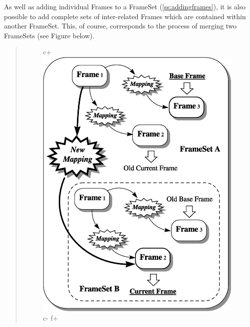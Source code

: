 \documentclass[twoside,11pt]{article}
\newcommand{\secref}[1]{\S\ref{#1}}
\renewcommand{\secref}[1]{\ref{#1}}
\begin{document}
\begin{htmlonly}
   As well as adding individual Frames to a FrameSet
   (\secref{ss:addingframes}), it is also possible to add complete sets of
   inter-related Frames which are contained within another
   FrameSet. This, of course, corresponds to the process of merging two
   FrameSets (see Figure below).
   \begin{quote}
   \begin{figure}[hbtp]
   \label{fig:fsmerge}
c+
   \includegraphics[scale=0.75]{sun211_figures/fsmerge.eps}
c-
f+

\end{figure}
\end{quote}
\end{htmlonly}
\end{document}
